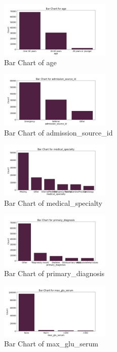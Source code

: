\documentclass{article}%
\begin{document}
%


\begin{figure}[h!]%
\centering%
\includegraphics[width=200px]{eda/bar_charts/age_bar_chart.png}%
\caption{Bar Chart of age}%
\end{figure}

%


\begin{figure}[h!]%
\centering%
\includegraphics[width=200px]{eda/bar_charts/admission_source_id_bar_chart.png}%
\caption{Bar Chart of admission\_source\_id}%
\end{figure}

%


\begin{figure}[h!]%
\centering%
\includegraphics[width=200px]{eda/bar_charts/medical_specialty_bar_chart.png}%
\caption{Bar Chart of medical\_specialty}%
\end{figure}

%


\begin{figure}[h!]%
\centering%
\includegraphics[width=200px]{eda/bar_charts/primary_diagnosis_bar_chart.png}%
\caption{Bar Chart of primary\_diagnosis}%
\end{figure}

%


\begin{figure}[h!]%
\centering%
\includegraphics[width=200px]{eda/bar_charts/max_glu_serum_bar_chart.png}%
\caption{Bar Chart of max\_glu\_serum}%
\end{figure}
\end{document}

